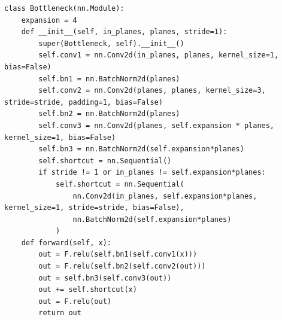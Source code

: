 \begin{lstlisting}[caption={Kode ResNet-50 28x28}, label={code:4.kode_resnet50_28}]
class Bottleneck(nn.Module):
    expansion = 4
    def __init__(self, in_planes, planes, stride=1):
        super(Bottleneck, self).__init__()
        self.conv1 = nn.Conv2d(in_planes, planes, kernel_size=1, bias=False)
        self.bn1 = nn.BatchNorm2d(planes)
        self.conv2 = nn.Conv2d(planes, planes, kernel_size=3, stride=stride, padding=1, bias=False)
        self.bn2 = nn.BatchNorm2d(planes)
        self.conv3 = nn.Conv2d(planes, self.expansion * planes, kernel_size=1, bias=False)
        self.bn3 = nn.BatchNorm2d(self.expansion*planes)
        self.shortcut = nn.Sequential()
        if stride != 1 or in_planes != self.expansion*planes:
            self.shortcut = nn.Sequential(
                nn.Conv2d(in_planes, self.expansion*planes, kernel_size=1, stride=stride, bias=False),
                nn.BatchNorm2d(self.expansion*planes)
            )
    def forward(self, x):
        out = F.relu(self.bn1(self.conv1(x)))
        out = F.relu(self.bn2(self.conv2(out)))
        out = self.bn3(self.conv3(out))
        out += self.shortcut(x)
        out = F.relu(out)
        return out
\end{lstlisting}


